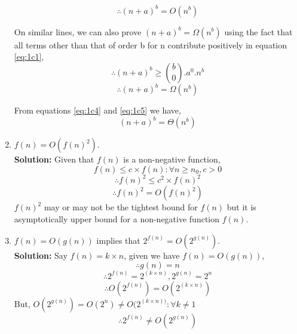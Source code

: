 \documentclass[11pt]{article}
\begin{document}
\begin{enumerate}
	\begin{equation} \label{eq:1c4}
		\boxed{\therefore (n+a)^b = O(n^{b})}
	\end{equation}
	
	On similar lines, we can also prove $(n+a)^b=\Omega(n^b)$ using the fact that all terms other than that of order b for n contribute positively in equation \ref{eq:1c1},
	\begin{equation*}
		\therefore (n+a)^b \ge {b \choose 0}.a^0.n^{b}
	\end{equation*}
	\begin{equation} \label{eq:1c5}
		\boxed{\therefore (n+a)^b=\Omega(n^b)}
	\end{equation}
	
	From equations \ref{eq:1c4} and \ref{eq:1c5} we have,
	\begin{equation*}
		\boxed{(n+a)^b=\Theta(n^b)}
	\end{equation*}
	
    \item $f(n)=O(f(n)^2)$. \\
    \textbf{Solution:}
   	Given that $f(n)$ is a non-negative function,
    \begin{equation*}
		f(n) \le  c \times f(n) : \forall n \ge n_0, c > 0
    \end{equation*}
    \begin{equation*}
		\therefore f(n)^2 \le  c^2 \times f(n)^2
	\end{equation*}
	\begin{equation*}
		\boxed{\therefore f(n)^2 =  O(f(n)^2)}
	\end{equation*}
	$f(n)^2$ may or may not be the tightest bound for $f(n)$ but it is asymptotically upper bound for a non-negative function $f(n)$.
	
    \item $f(n)=O(g(n))$ implies that $2^{f(n)}=O(2^{g(n)})$. \\
    \textbf{Solution:}
    Say $f(n)=k \times n$, given we have $f(n)=O(g(n))$, \\
	\begin{equation*}
	\therefore g(n)=n
	\end{equation*}
	\begin{equation*}
    \therefore 2^{f(n)} = 2^{(k \times n)}, 2^{g(n)} = 2^n
    \end{equation*}
    \begin{equation*}
    \therefore O(2^{f(n)}) = O(2^{(k \times n)})
    \end{equation*}
    But, $O(2^{g(n)}) = O(2^{n}) \ne O(2^{(k \times n))} :  \forall k \neq 1$
	\begin{equation*}
	    \boxed{\therefore 2^{f(n)} \ne O(2^{g(n)})}
	\end{equation*}

    \end{enumerate}
    
\end{document}
